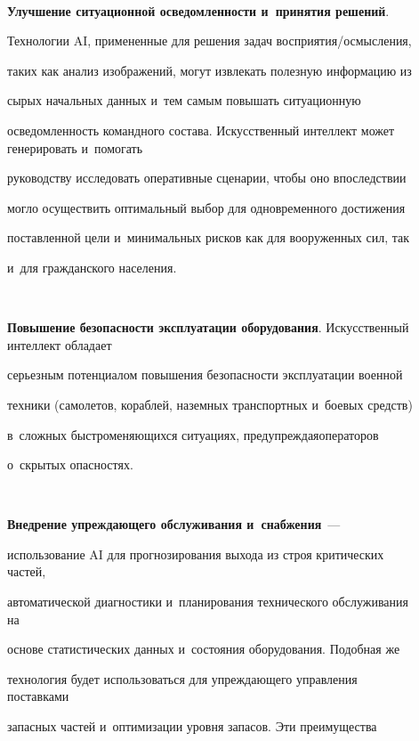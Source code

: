 \begin{description}


\item[\,]


  \textbf{Улучшение ситуационной осведомленности и~принятия решений}.


Технологии AI, примененные для решения задач вос\-при\-я\-тия\!/\!осмыс\-ле\-ния,


таких как анализ изображений, могут извлекать полезную информацию из


сырых начальных данных и~тем самым повышать ситуационную


осведомленность командного состава. Искусственный интеллект может генерировать и~помогать


руководству исследовать оперативные сценарии, чтобы оно впоследствии


могло осуществить оптимальный выбор для одновременного достижения


по\-став\-лен\-ной цели и~минимальных рисков как для вооруженных сил, так


и~для гражданского населения.


\item[\,]


  \textbf{Повышение безопасности эксплуатации оборудования}. Искусственный интеллект обладает


серьезным потенциалом повышения безопас\-ности эксплуатации военной


техники (самолетов, кораблей, наземных транспортных и~боевых средств)


в~слож\-ных быст\-ро\-ме\-ня\-ющих\-ся ситуациях, предуп\-реж\-дая\linebreak операторов


о~скрытых опасностях.


\item[\,]


  \textbf{Внедрение упреждающего обслуживания и~снабжения}~---


использование AI для прогнозирования выхода из строя критических частей,


автоматической диагностики и~планирования технического обслуживания на


основе статистических данных и~со\-сто\-яния оборудования. Подобная же


технология будет использоваться для упреж\-да\-юще\-го управ\-ле\-ния поставками


запасных частей и~оптимизации уровня запасов. Эти преимущества



\end{description}
